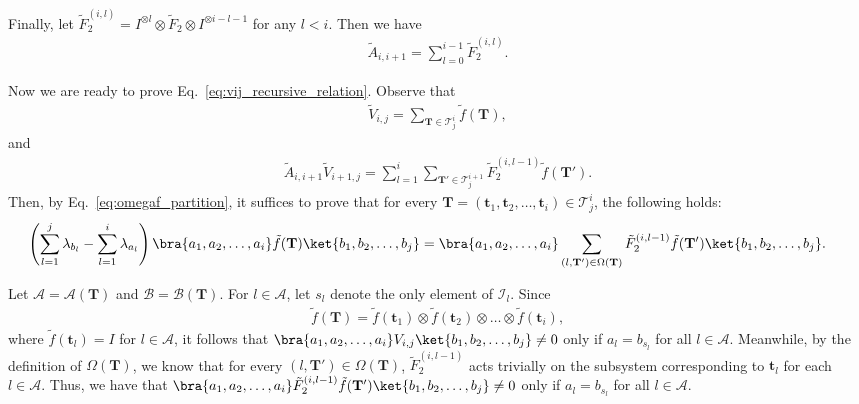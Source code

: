 \documentclass[superscriptaddress,onecolumn,nofootinbib,longbibliography,a4paper,accepted=2026-09-29]{quantumarticle}
\theoremstyle{plain}
\theoremstyle{definition}
\numberwithin{thm}{section}
\numberwithin{assumption}{section}
\numberwithin{lemma}{section}
\numberwithin{prop}{section}
\numberwithin{cor}{section}
\numberwithin{definition}{section}
\numberwithin{rmk}{section}
\numberwithin{equation}{section}
\newcommand{\lrb}[1]{\left ( #1 \right )}
\newcommand{\mbt}{\mathbf{t}}
\newcommand{\mbf}{\mathbf{T}}
\begin{document}
Finally, let $\tilde{F}_2^{(i,l)}=I^{\otimes l} \otimes \tilde{F}_2 \otimes I^{\otimes i-l-1}$ for any $l<i$. Then we have 
\begin{align}
\tilde{A}_{i,i+1}=\sum_{l=0}^{i-1} \tilde{F}_2^{(i,l)}.    
\end{align}

Now we are ready to prove Eq.~\eqref{eq:vij_recursive_relation}. Observe that \begin{align}
    \tilde{V}_{i,j}=\sum_{\mbf \in \mathcal{T}^i_j} \tilde{f}(\mbf),
    \label{eq:vij_ff}
\end{align}
and
\begin{align}
    \tilde{A}_{i,i+1}\tilde{V}_{i+1,j}=\sum_{l=1}^{i}\sum_{\mbf' \in \mathcal{T}^{i+1}_j} \tilde{F}_2^{(i,l-1)}\tilde{f}(\mbf').
    \label{eq:aiivij_ff}
\end{align}
Then, by Eq.~\eqref{eq:omegaf_partition}, it suffices to prove that 
for every $\mbf = (\mathbf{t}_1, \mathbf{t}_2, \dots, \mathbf{t}_i)
\in \mathcal{T}^i_j$, the following holds:
\begin{align}
\hspace{-15pt} \lrb{\sum_{l=1}^j \lambda_{b_l} - \sum_{l=1}^i \lambda_{a_l}}\bra{a_1,a_2,\dots, a_i}  \tilde{f}(\mbf)\ket{b_1,b_2,\dots,b_j} = \bra{a_1,a_2,\dots, a_i} \sum_{(l, \mbf') \in \Omega(\mbf)} \tilde{F}_2^{(i,l-1)} \tilde{f}(\mbf')\ket{b_1,b_2,\dots,b_j}.   
    \label{eq:ffff}
\end{align}


Let $\mathcal{A}=\mathcal{A}(\mbf)$ and $\mathcal{B}=\mathcal{B}(\mbf)$. For $l \in \mathcal{A}$, let $s_l$ denote the only element of $\mathcal{I}_l$. Since 
\begin{align}
\tilde{f}(\mbf) = \tilde{f}(\mbt_1) \otimes \tilde{f}(\mbt_2) \otimes \dots \otimes \tilde{f}(\mbt_i),   
\end{align}
where $\tilde{f}(\mbt_l)=I$ for $l \in \mathcal{A}$, it follows that
$\bra{a_1,a_2,\dots, a_i}  V_{i,j}\ket{b_1,b_2,\dots,b_j} \neq 0$ only if $a_l=b_{s_l}$ for all $l \in \mathcal{A}$. Meanwhile, by the definition of $\Omega(\mbf)$, we know that for every $(l, \mbf') \in \Omega(\mbf)$, $\tilde{F}_2^{(i,l-1)}$ acts trivially on the subsystem corresponding to $\mathbf{t}_l$ for each $l \in \mathcal{A}$. Thus,  we have that
$\bra{a_1,a_2,\dots, a_i}  \tilde{F}_2^{(i,l-1)} \tilde{f}(\mbf') \ket{b_1,b_2,\dots,b_j} \neq 0$ only if $a_l=b_{s_l}$ for all $l \in \mathcal{A}$.
\end{document}
